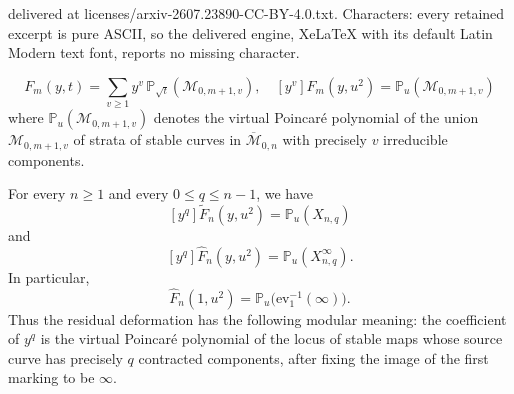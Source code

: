\documentclass[10pt,a4paper]{amsart}
\newcommand{\Ft}{\widetilde{F}}
\newcommand{\Mbarzn}{\overline{\mathcal M}_{0,n}}
\newcommand{\PP}{\mathbb{P}}
\newcommand{\cM}{\mathcal{M}}
\begin{document}
delivered at licenses/arxiv-2607.23890-CC-BY-4.0.txt. Characters: every retained excerpt is pure ASCII, so the delivered engine, XeLaTeX with its default Latin Modern text font, reports no missing character.
\begin{theorem}\label{10}
$$F_m(y,t)=\sum_{v\ge 1} y^v\,\PP_{\sqrt{t}}(\cM_{0,m+1,v}), \quad [y^v]F_m(y,u^2)=\PP_{u}(\cM_{0,m+1,v})$$ where $\PP_u(\cM_{0,m+1,v})$ denotes the virtual Poincar\'e polynomial of the union $\cM_{0,m+1,v}$
of strata of stable curves in $\Mbarzn$ with precisely $v$ irreducible components.  
\end{theorem}

\begin{theorem}
\label{prop:FM-coefficient-interpretation}
For every $n\ge 1$ and every $0\le q\le n-1$, we have
\begin{equation}\label{eq:FM-coeff-full}
  [y^q]\Ft_n(y,u^2)=\PP_u(X_{n,q})
\end{equation}
and
\begin{equation}\label{eq:FM-coeff-residual}
  [y^q]\widehat F_n(y,u^2)=\PP_u(X_{n,q}^{\infty}).
\end{equation}
In particular,
\[
  \widehat F_n(1,u^2)=\PP_u\bigl(\mathrm{ev}_1^{-1}(\infty)\bigr).
\]
Thus the residual deformation has the following modular meaning: the
coefficient of $y^q$ is the virtual Poincar\'e polynomial of the locus of
stable maps whose source curve has precisely $q$ contracted components, after
fixing the image of the first marking to be $\infty$.
\end{theorem}
\end{document}
